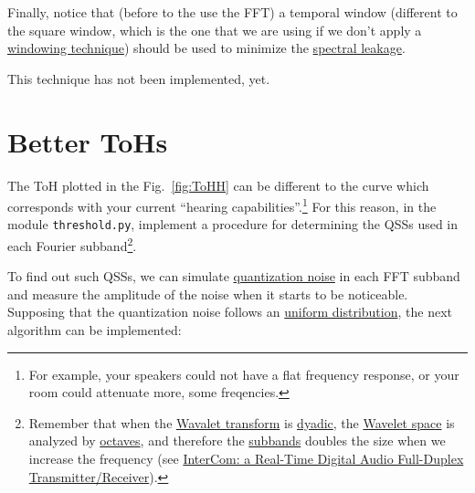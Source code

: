 Finally, notice that (before to the use the FFT) a temporal window
(different to the square window, which is the one that we are using if
we don't apply a
\href{https://en.wikipedia.org/wiki/Window_function}{windowing
  technique}) should be used to minimize the
\href{https://en.wikipedia.org/wiki/Spectral_leakage}{spectral
  leakage}.

This technique has not been implemented, yet.

\section{Better ToHs}
\label{sec:better_ToH}

The ToH plotted in the Fig.~\ref{fig:ToHH} can be
different to the curve which corresponds with your current ``hearing
capabilities''.\footnote{For example, your speakers could not have a
  flat frequency response, or your room could attenuate more, some
  freqencies.} For this reason, in the module \verb|threshold.py|,
implement a procedure for determining the QSSs used in
each Fourier subband\footnote{Remember that when the
  \href{https://en.wikipedia.org/wiki/Wavelet_transform}{Wavalet
    transform} is
  \href{https://en.wikipedia.org/wiki/Dyadic_rational}{dyadic}, the
  \href{https://en.wikipedia.org/wiki/Discrete_wavelet_transform}{Wavelet
    space} is analyzed by
  \href{https://en.wikipedia.org/wiki/Octave_band}{octaves}, and
  therefore the
  \href{https://en.wikipedia.org/wiki/Filter_bank}{subbands} doubles
  the size when we increase the frequency (see \href{https://github.com/Tecnologias-multimedia/InterCom/blob/master/docs/2-hours_seminar.ipynb}{
  InterCom: a Real-Time Digital Audio Full-Duplex
  Transmitter/Receiver}).}.
  
To find out such QSSs, we can simulate
\href{https://en.wikipedia.org/wiki/Quantization_(signal_processing)}{quantization
  noise} in each FFT subband and measure the amplitude of the noise when
it starts to be noticeable. Supposing that the quantization noise
follows an
\href{https://en.wikipedia.org/wiki/Continuous_uniform_distribution}{uniform
  distribution}, the next algorithm can be implemented:

